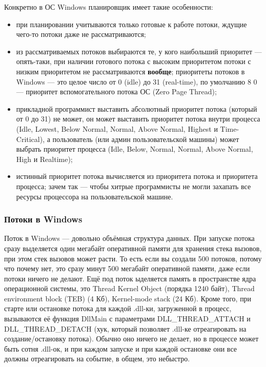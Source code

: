 \documentclass[a5paper]{article}
\begin{document}
Конкретно в ОС Windows планировщик имеет такие особенности:
\begin{itemize}
    \item при планировании учитываются только готовые к работе потоки, ждущие чего-то потоки даже не рассматриваются;
    \item из рассматриваемых потоков выбираются те, у кого наибольший приоритет --- опять-таки, при наличии готового потока с высоким приоритетом потоки с низким приоритетом не рассматриваются \textbf{вообще}; приоритеты потоков в Windows --- это целое число от 0 (idle) до 31 (real-time), по умолчанию 8 0 --- приоритет вспомогательного потока ОС (Zero Page Thread);
    \item прикладной программист выставить абсолютный приоритет потока (который от 0 до 31) не может, он может выставить приоритет потока внутри процесса (Idle, Lowest, Below Normal, Normal, Above Normal, Highest и Time-Critical), а пользователь (или админ пользовательской машины) может выбрать приоритет процесса (Idle, Below, Normal, Normal, Above Normal, High и Realtime);
    \item истинный приоритет потока вычисляется из приоритета потока и приоритета процесса; зачем так --- чтобы хитрые программисты не могли захапать все ресурсы процессора на пользовательской машине.
\end{itemize}

\subsubsection{Потоки в Windows}

Поток в Windows --- довольно объёмная структура данных. При запуске потока сразу выделяется один мегабайт оперативной памяти для хранения стека вызовов, при этом стек вызовов может расти. То есть если вы создали 500 потоков, потому что почему нет, это сразу минут 500 мегабайт оперативной памяти, даже если потоки ничего не делают. Ещё под поток ыделяется память в пространстве ядра операционной системы, это Thread Kernel Object (порядка 1240 байт), Thread environment block (TEB) (4 Кб), Kernel-mode stack (24 Кб). Кроме того, при старте или остановке потока для каждой .dll-ки, загруженной в процесс, вызываются её функция DllMain с параметрами DLL\_THREAD\_ATTACH и DLL\_THREAD\_DETACH (хук, который позволяет .dll-ке отреагировать на создание/остановку потока). Обычно оно ничего не делает, но в процессе может быть сотня .dll-ок, и при каждом запуске и при каждой остановке они все должны отреагировать на событие, в общем, это небыстро.
\end{document}
